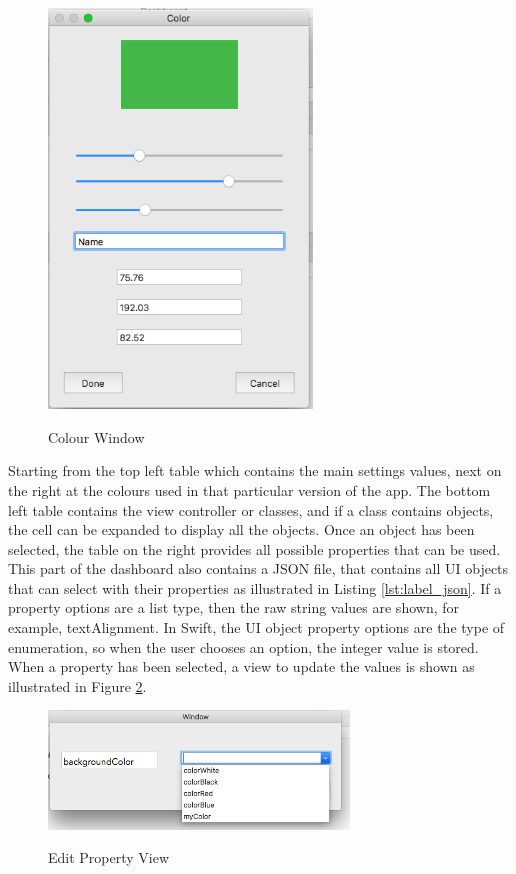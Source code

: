 \begin{figure}[!h]
    \caption{Colour Window}
    \centering
    \includegraphics[width=70mm]{images/color_view}
    \label{fig:color_view}
\end{figure} 

Starting from the top left table which contains the main settings values, next on the right at the colours used in that particular version of the app. The bottom left table contains the view controller or classes, and if a class contains objects, the cell can be expanded to display all the objects. Once an object has been selected, the table on the right provides all possible properties that can be used. This part of the dashboard also contains a JSON file, that contains all UI objects that can select with their properties as illustrated in Listing \ref{lst:label_json}. If a property options are a list type, then the raw string values are shown, for example, textAlignment. In Swift, the UI object property options are the type of enumeration, so when the user chooses an option, the integer value is stored. When a property has been selected, a view to update the values is shown as illustrated in Figure \ref{fig:property1}.



\begin{figure}[!h]
    \caption{Edit Property View}
    \centering
    \includegraphics[width=80mm]{images/dashboard/property-1}
    \label{fig:property1}
\end{figure} 

